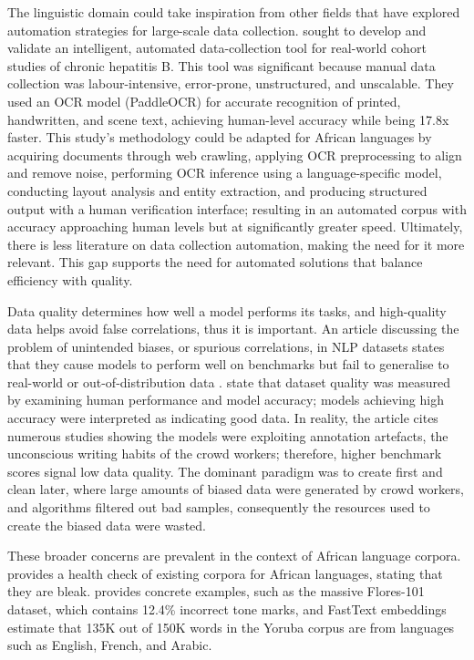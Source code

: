 \documentclass[11pt,a4paper]{article}
\begin{document}
The linguistic domain could take inspiration from other fields that have explored automation strategies for large-scale data collection. \citet{Zhou2024} sought to develop and validate an intelligent, automated data-collection tool for real-world cohort studies of chronic hepatitis B. This tool was significant because manual data collection was labour-intensive, error-prone, unstructured, and unscalable. They used an OCR model (PaddleOCR) for accurate recognition of printed, handwritten, and scene text, achieving human-level accuracy while being 17.8x faster. This study's methodology could be adapted for African languages by acquiring documents through web crawling, applying OCR preprocessing to align and remove noise, performing OCR inference using a language-specific model, conducting layout analysis and entity extraction, and producing structured output with a human verification interface; resulting in an automated corpus with accuracy approaching human levels but at significantly greater speed. Ultimately, there is less literature on data collection automation, making the need for it more relevant. This gap supports the need for automated solutions that balance efficiency with quality. 

\vspace{1em}
Data quality determines how well a model performs its tasks, and high-quality data helps avoid false correlations, thus it is important. An article discussing the problem of unintended biases, or spurious correlations, in NLP datasets states that they cause models to perform well on benchmarks but fail to generalise to real-world or out-of-distribution data \citep{Mishra2020}. \citet{Mishra2020} state that dataset quality was measured by examining human performance and model accuracy; models achieving high accuracy were interpreted as indicating good data. In reality, the article cites numerous studies showing the models were exploiting annotation artefacts, the unconscious writing habits of the crowd workers; therefore, higher benchmark scores signal low data quality. The dominant paradigm was to create first and clean later, where large amounts of biased data were generated by crowd workers, and algorithms filtered out bad samples, consequently the resources used to create the biased data were wasted. 


These broader concerns are prevalent in the context of African language corpora. \citet{Adebara2022} provides a health check of existing corpora for African languages, stating that they are bleak. \citet{Adebara2022} provides concrete examples, such as the massive Flores-101 dataset, which contains 12.4\% incorrect tone marks, and FastText embeddings estimate that 135K out of 150K words in the Yoruba corpus are from languages such as English, French, and Arabic.
\end{document}
